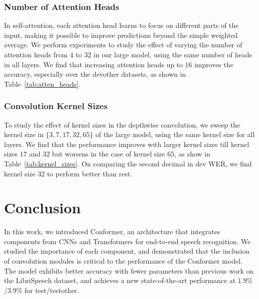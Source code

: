 \subsubsection{Number of Attention Heads}

In self-attention, each attention head learns to focus on different parts of the input, making it possible to improve predictions beyond the simple weighted average. We perform experiments to study the effect of varying the number of attention heads from $4$ to $32$ in our large model, using the same number of heads in all layers. We find that increasing attention heads up to $16$ improves the accuracy, especially over the devother datasets, as shown in Table~\ref{tab:atten_heads}.

\subsubsection{Convolution Kernel Sizes} To study the effect of kernel sizes in the depthwise convolution, we sweep the kernel size in $\{3, 7, 17, 32, 65\}$ of the large model, using the same kernel size for all layers. We find that the performance improves with larger kernel sizes till kernel sizes $17$ and $32$ but worsens in the case of kernel size $65$, as show in Table~\ref{tab:kernel_sizes}. On comparing the second decimal in dev WER, we find kernel size 32 to perform better than rest. 

\section{Conclusion}
In this work, we introduced Conformer, an architecture that integrates components from CNNs and Transformers for end-to-end speech recognition. We studied the importance of each component, and demonstrated that the inclusion of convolution modules is critical to the performance of the Conformer model. The model exhibits better accuracy with fewer parameters than previous work on the LibriSpeech dataset, and achieves a new state-of-the-art performance at $1.9\%$/$3.9\%$ for test/testother.


